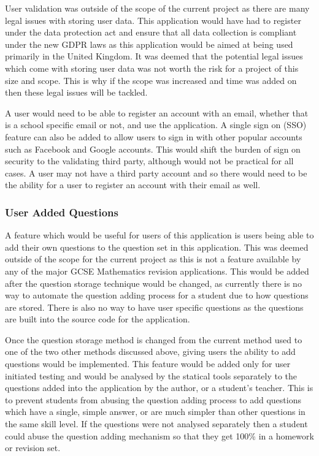 \documentclass{article}
\begin{document}
User validation was outside of the scope of the current project as there are many legal issues with storing user data. This application would have had to register under the data protection act and ensure that all data collection is compliant under the new GDPR laws as this application would be aimed at being used primarily in the United Kingdom. It was deemed that the potential legal issues which come with storing user data was not worth the risk for a project of this size and scope. This is why if the scope was increased and time was added on then these legal issues will be tackled. \par

A user would need to be able to register an account with an email, whether that is a school specific email or not, and use the application. A single sign on (SSO) feature can also be added to allow users to sign in with other popular accounts such as Facebook and Google accounts. This would shift the burden of sign on security to the validating third party, although would not be practical for all cases. A user may not have a third party account and so there would need to be the ability for a user to register an account with their email as well. \par

\subsubsection{User Added Questions}

A feature which would be useful for users of this application is users being able to add their own questions to the question set in this application. This was deemed outside of the scope for the current project as this is not a feature available by any of the major GCSE Mathematics revision applications. This would be added after the question storage technique would be changed, as currently there is no way to automate the question adding process for a student due to how questions are stored. There is also no way to have user specific questions as the questions are built into the source code for the application. \par

Once the question storage method is changed from the current method used to one of the two other methods discussed above, giving users the ability to add questions would be implemented. This feature would be added only for user initiated testing and would be analysed by the statical tools separately to the questions added into the application by the author, or a student's teacher. This is to prevent students from abusing the question adding process to add questions which have a single, simple answer, or are much simpler than other questions in the same skill level. If the questions were not analysed separately then a student could abuse the question adding mechanism so that they get 100\% in a homework or revision set. \par
\end{document}
